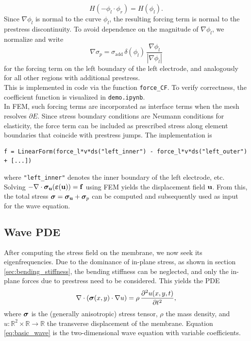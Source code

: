 \[
H(-\phi_l\cdot\phi_r)=H(\phi_l).
\]
Since $\nabla \phi_l$ is normal to the curve $\phi_l$, the resulting forcing term is normal to the prestress discontinuity. To avoid dependence on the magnitude of $\nabla \phi_l$, we normalize and write
\begin{equation*}
    \nabla\sigma_p = \sigma_{\mathrm{add}}\, \delta(\phi_l)\, \frac{\nabla \phi_l}{|\nabla \phi_l|}
\end{equation*}
for the forcing term on the left boundary of the left electrode, and analogously for all other regions with additional prestress.\\
This is implemented in code via the function \texttt{force\_CF}. To verify correctness, the coefficient function is visualized in \texttt{demo.ipynb}.\\

In FEM, such forcing terms are incorporated as interface terms when the mesh resolves $\partial E$. Since stress boundary conditions are Neumann conditions for elasticity, the force term can be included as prescribed stress along element boundaries that coincide with prestress jumps. The implementation is
\begin{verbatim}
f = LinearForm(force_l*v*ds("left_inner") - force_l*v*ds("left_outer") + [...])
\end{verbatim}
where \texttt{"left\_inner"} denotes the inner boundary of the left electrode, etc.\\

Solving $-\nabla\cdot\boldsymbol{\sigma}_{\mathbf{u}}(\boldsymbol{\varepsilon}(\mathbf{u})) = \mathbf{f}$ using FEM yields the displacement field $\mathbf{u}$. From this, the total stress $\boldsymbol{\sigma} = \boldsymbol{\sigma}_{\mathbf{u}} + \boldsymbol{\sigma}_p$ can be computed and subsequently used as input for the wave equation.




\subsection{Wave PDE}
\label{sec:wave_pde}
After computing the stress field on the membrane, we now seek its eigenfrequencies. Due to the dominance of in-plane stress, as shown in section \ref{sec:bending_stiffness}, the bending stiffness can be neglected, and only the in-plane forces due to prestress need to be considered. This yields the PDE
\begin{equation}
    \nabla \cdot \left( \boldsymbol{\sigma}(x,y) \cdot \nabla u \right) 
    = \rho \, \frac{\partial^2 u(x,y,t)}{\partial t^2},
    \label{eq:basic_wave}
\end{equation}
where $\boldsymbol{\sigma}$ is the (generally anisotropic) stress tensor, $\rho$ the mass density, and $u:\mathbb{R}^2\times \mathbb{R} \to \mathbb{R}$ the transverse displacement of the membrane. Equation \eqref{eq:basic_wave} is the two-dimensional wave equation with variable coefficients.\\

